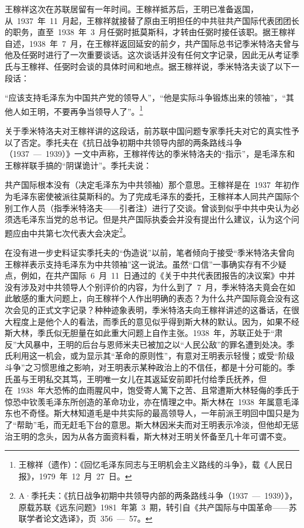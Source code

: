 王稼祥这次在苏联居留有一年时间。王稼祥抵苏后，王明已准备返国，从~1937~年~11~月起，王稼祥就接替了原由王明担任的中共驻共产国际代表团团长的职务，直至~1938~年~3~月任弼时抵莫斯科，才转由任弼时接任该职。据王稼祥自述，1938~年~7~月，在王稼祥返回延安的前夕，共产国际总书记季米特洛夫曾与他及任弼时进行了一次重要谈话。这次谈话并没有任何文字记录，因此无从考证季氏与王稼祥、任弼时会谈的具体时间和地点。据王稼祥说，季米特洛夫谈了以下一段话：

\begin{quoting}
“应该支持毛泽东为中国共产党的领导人”，“他是实际斗争锻炼出来的领袖”，“其他人如王明，不要再争当领导人了”。\footnote{王稼祥（遗作）：《回忆毛泽东同志与王明机会主义路线的斗争》，载《人民日报》，1979~年~12~月~27~日。}
\end{quoting}

关于季米特洛夫对王稼祥讲的这段话，前苏联中国问题专家季托夫对它的真实性予以了否定。季托夫在《抗日战争初期中共领导内部的两条路线斗争（1937~—~1939）》一文中声称，王稼祥传达的季米特洛夫的“指示”，是毛泽东和王稼祥联手搞的“阴谋诡计”。季托夫说：

\begin{quoting}
共产国际根本没有（决定毛泽东为中共领袖）那个意思。王稼祥是在~1937~年初作为毛泽东密使被派往莫斯科的。为了完成毛泽东的委托，王稼祥本人同共产国际个别工作人员（指季米特洛夫——引者注）进行了交谈。曾谈到似乎中共中央认为必须选毛泽东当党的总书记。但是共产国际执委会并没有提出什么建议，认为这个问题应由中共第七次代表大会决定\footnote{A·季托夫：《抗日战争初期中共领导内部的两条路线斗争（1937~—~1939）》，原载苏联《远东问题》1981~年第~3~期，转引自《共产国际与中国革命——苏联学者论文选译》，页~356~—~57。}。
\end{quoting}

在没有进一步史料证实季托夫的“伪造说”以前，笔者倾向于接受“季米特洛夫曾向王稼祥表示支持毛泽东为中共领袖”这一说法。虽然“口信”一事确实存有不少疑点，例如，在共产国际~6~月~11~日通过的《关于中共代表团报告的决议案》中并没有涉及对中共领导人个别评价的内容，为什么到了~7~月，季米特洛夫竟会在如此敏感的重大问题上，向王稼祥个人作出明确的表态？为什么共产国际竟会没有这次会见的正式文字记录？种种迹象表明，季米特洛夫向王稼祥讲述的这番话，在很大程度上是他个人的看法，而季氏的意见似乎得到斯大林的默认。因为，如果不经斯大林，季氏似无胆量在如此重大问题上自作主张。1938~年，苏联正处于“肃反”大风暴中，王明的后台与恩师米夫已被加之以“人民公敌”的罪名遭到处决。季氏利用这一机会，或为显示其“革命的原则性”，有意对王明表示轻慢；或受“阶级斗争”之习惯思维之影响，对王明表示某种政治上的不信任，都是十分可能的。季氏虽与王明私交其笃，王明唯一女儿在其返延安前即托付给季氏抚养，但在~1938~年大恐怖的血雨腥风中，饱受寄人篱下之苦、且常遭斯大林轻侮的季氏于惊恐中钦羡毛泽东所创造的革命功业，亦在情理之中。斯大林在~1938~年属意毛泽东也不奇怪。斯大林知道毛是中共实际的最高领导人，一年前派王明回中国只是为了“帮助”毛，而无赶毛下台的意思。斯大林因米夫而对王明表示冷淡，但他却无惩治王明的念头，因为从各方面资料看，斯大林对王明关怀备至几十年可谓不变。

